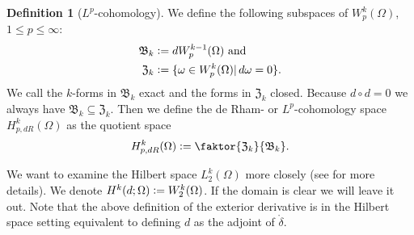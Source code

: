 \documentclass[12pt,a4paper]{article}
\theoremstyle{definition}
\newtheorem{definition}{Definition}
\newcommand{\lpcoho}{H^k_{p,dR}}
\begin{document}
\begin{definition}[$L^p$-cohomology]
    We define the following subspaces of $W^k_p(\Omega)$, $1\leq p \leq\infty$:
    \begin{align*}
        \mathfrak{B}_k &\vcentcolon= dW^{k-1}_p(\Omega) \text{ and} \\
        \mathfrak{Z}_k &\vcentcolon= \{ \omega \in W^k_p(\Omega)| 
        \, d\omega = 0\}.
    \end{align*}
    We call the $k$-forms in $\mathfrak{B}_k$ exact and the forms in 
    $\mathfrak{Z}_k$ closed. Because $d \circ d=0$ we always have  
    $\mathfrak{B}_k \subseteq \mathfrak{Z}_k$.
    Then we define the de Rham- or $L^p$-cohomology space $\lpcoho(\Omega)$ as 
    the quotient space
    \begin{align*}
        \lpcoho (\Omega) \vcentcolon= \faktor{\mathfrak{Z}_k}{\mathfrak{B}_k}.
    \end{align*}
\end{definition}
\vspace{0.5cm}
We want to examine the Hilbert space $L^k_2(\Omega)$ more closely
(see \cite[Sec. 6.2.6]{arnold} for more details).  
We denote $H^k(d;\Omega) \vcentcolon= W^k_2(\Omega)$. If the domain is clear
we will leave it out. Note that the above definition of the exterior derivative
is in the Hilbert space setting equivalent to defining $d$ as the adjoint
of $\mathring{\delta}$. 
\end{document}
